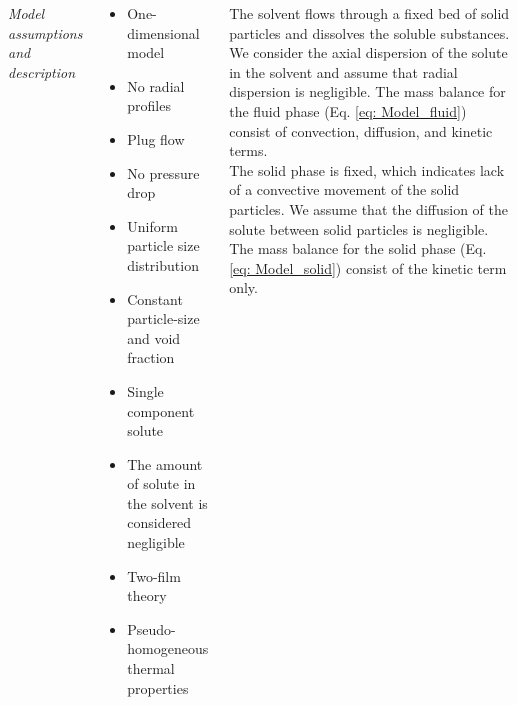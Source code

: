 \documentclass[17pt, a0paper, portrait, margin=10mm, innermargin=15mm, blockverticalspace=15mm, colspace=15mm, subcolspace=8mm]{tikzposter}
\begin{document}
\begin{columns}
{			\textit{Model assumptions and description}
			
			\begin{multicols}{2}
				\begin{itemize}
					\item One-dimensional model
					\item No radial profiles
					\item Plug flow 
					\item No pressure drop
					\item Uniform particle size distribution
					\item Constant particle-size and void fraction
					\item Single component solute
					\item The amount of solute in the solvent is considered negligible
					\item Two-film theory
					\item Pseudo-homogeneous thermal properties
				\end{itemize}
			\end{multicols}
		

				\vspace{1.5cm}

				The solvent flows through a fixed bed of solid particles and dissolves the soluble substances. We consider the axial dispersion of the solute in the solvent and assume that radial dispersion is negligible. The mass balance for the fluid phase (Eq. \ref{eq: Model_fluid}) consist of convection, diffusion, and kinetic terms.\\
				
				The solid phase is fixed, which indicates lack of a convective movement of the solid particles. We assume that the diffusion of the solute between solid particles is negligible. The mass balance for the solid phase (Eq. \ref{eq: Model_solid}) consist of the kinetic term only.%
				
}
\end{columns}
\end{document}
